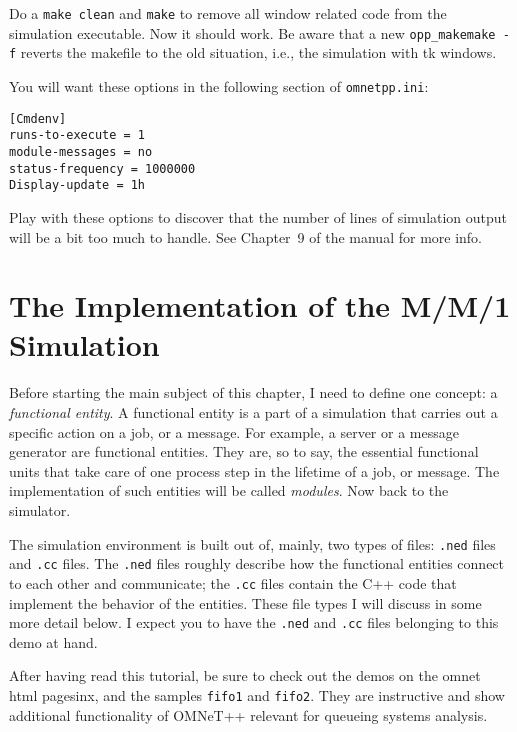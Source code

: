 \documentclass[a4paper]{article}
\begin{document}
Do a \texttt{make clean} and \texttt{make} to remove all window
related code from the simulation executable. Now it should work. Be
aware that a new \texttt{opp\_makemake -f} reverts the makefile to the old
situation, i.e., the simulation with tk windows.

You will want these options in the following section of
\texttt{omnetpp.ini}:
\begin{verbatim}
[Cmdenv]
runs-to-execute = 1
module-messages = no
status-frequency = 1000000
Display-update = 1h
\end{verbatim}
Play with these options to discover that the number of lines of
simulation output will be a bit too much to handle. See Chapter~9 of
the manual for more info.


\section{The Implementation of the M/M/1 Simulation}
\label{sec:impl-fifo-simul}
Before starting the main subject of this chapter, I need to define one
concept: a \emph{functional entity}. A functional entity is a part of
a simulation that carries out a specific action on a job, or a
message. For example, a server or a message generator are functional
entities. They are, so to say, the essential functional units that take
care of one process step in the lifetime of a job, or message. The
implementation of such entities will be called \emph{modules}. Now
back to the simulator.

The simulation environment is built out of, mainly, two types of
files: \texttt{.ned} files and \texttt{.cc} files.  The \texttt{.ned}
files roughly describe how the functional entities connect to each
other and communicate; the \texttt{.cc} files contain the C++ code
that implement the behavior of the entities. These file types I will
discuss in some more detail below. I expect you to have the
\texttt{.ned} and \texttt{.cc} files belonging to this demo at hand.

After having read this tutorial, be sure to check out the demos on the
omnet html pagesinx, and the samples \texttt{fifo1} and \texttt{fifo2}.
They are instructive and show additional functionality of OMNeT++
relevant for queueing systems analysis.
\end{document}
